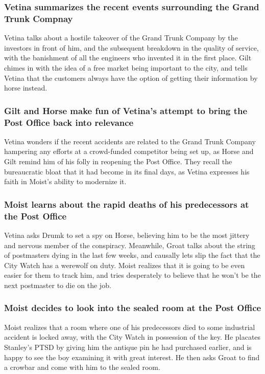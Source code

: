 \subsubsection{\Gls{Vetina} summarizes the recent events surrounding the Grand Trunk Compnay}
\Gls{Vetina} talks about a hostile takeover of the Grand Trunk Company by the investors in front
of him, and the subsequent breakdown in the quality of service, with the banishment of all the
engineers who invented it in the first place. \Gls{Gilt} chimes in with the idea of a free market
being important to the city, and tells \Gls{Vetina} that the customers always have the option of
getting their information by horse instead.

\subsubsection{\Gls{Gilt} and \Gls{Horse} make fun of \Gls{Vetina}'s attempt to bring the Post
    Office back into relevance}
\Gls{Vetina} wonders if the recent accidents are related to the Grand Trunk Company hampering any
efforts at a crowd-funded competitor being set up, as \Gls{Horse} and \Gls{Gilt} remind him of his
folly in reopening the Post Office. They recall the bureaucratic bloat that it had become in its
final days, as \Gls{Vetina} expresses his faith in \Gls{Moist}'s ability to modernize it.

\subsubsection{\Gls{Moist} learns about the rapid deaths of his predecessors at the Post Office}
\Gls{Vetina} asks \Gls{Drumk} to set a spy on \Gls{Horse}, believing him to be the most jittery and
nervous member of the conspiracy. Meanwhile, \Gls{Groat} talks about the string of postmasters dying
in the last few weeks, and causally lets slip the fact that the City Watch has a werewolf on duty.
\Gls{Moist} realizes that it is going to be even easier for them to track him, and tries desperately
to believe that he won't be the next postmaster to die on the job.

\subsubsection{\Gls{Moist} decides to look into the sealed room at the Post Office}
\Gls{Moist} realizes that a room where one of his predecessors died to some industrial accident is
locked away, with the City Watch in possession of the key. He placates \Gls{Stanley}'s PTSD by
giving him the antique pin he had purchased earlier, and is happy to see the boy examining it with
great interest. He then asks \Gls{Groat} to find a crowbar and come with him to the sealed room.

